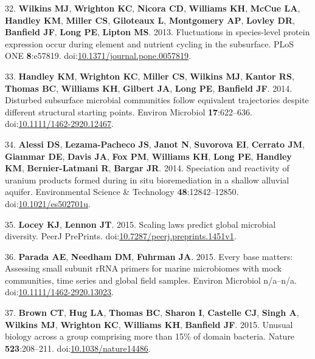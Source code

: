 \documentclass[11pt,]{article}
\begin{document}
\hypertarget{ref-Wilkins2013}{}
32. \textbf{Wilkins MJ}, \textbf{Wrighton KC}, \textbf{Nicora CD},
\textbf{Williams KH}, \textbf{McCue LA}, \textbf{Handley KM},
\textbf{Miller CS}, \textbf{Giloteaux L}, \textbf{Montgomery AP},
\textbf{Lovley DR}, \textbf{Banfield JF}, \textbf{Long PE},
\textbf{Lipton MS}. 2013. Fluctuations in species-level protein
expression occur during element and nutrient cycling in the subsurface.
PLoS ONE \textbf{8}:e57819.
doi:\href{https://doi.org/10.1371/journal.pone.0057819}{10.1371/journal.pone.0057819}.

\hypertarget{ref-Handley2014}{}
33. \textbf{Handley KM}, \textbf{Wrighton KC}, \textbf{Miller CS},
\textbf{Wilkins MJ}, \textbf{Kantor RS}, \textbf{Thomas BC},
\textbf{Williams KH}, \textbf{Gilbert JA}, \textbf{Long PE},
\textbf{Banfield JF}. 2014. Disturbed subsurface microbial communities
follow equivalent trajectories despite different structural starting
points. Environ Microbiol \textbf{17}:622--636.
doi:\href{https://doi.org/10.1111/1462-2920.12467}{10.1111/1462-2920.12467}.

\hypertarget{ref-Alessi2014}{}
34. \textbf{Alessi DS}, \textbf{Lezama-Pacheco JS}, \textbf{Janot N},
\textbf{Suvorova EI}, \textbf{Cerrato JM}, \textbf{Giammar DE},
\textbf{Davis JA}, \textbf{Fox PM}, \textbf{Williams KH}, \textbf{Long
PE}, \textbf{Handley KM}, \textbf{Bernier-Latmani R}, \textbf{Bargar
JR}. 2014. Speciation and reactivity of uranium products formed during
in situ bioremediation in a shallow alluvial aquifer. Environmental
Science \& Technology \textbf{48}:12842--12850.
doi:\href{https://doi.org/10.1021/es502701u}{10.1021/es502701u}.

\hypertarget{ref-Locey2015}{}
35. \textbf{Locey KJ}, \textbf{Lennon JT}. 2015. Scaling laws predict
global microbial diversity. PeerJ PrePrints.
doi:\href{https://doi.org/10.7287/peerj.preprints.1451v1}{10.7287/peerj.preprints.1451v1}.

\hypertarget{ref-Parada2015}{}
36. \textbf{Parada AE}, \textbf{Needham DM}, \textbf{Fuhrman JA}. 2015.
Every base matters: Assessing small subunit rRNA primers for marine
microbiomes with mock communities, time series and global field samples.
Environ Microbiol n/a--n/a.
doi:\href{https://doi.org/10.1111/1462-2920.13023}{10.1111/1462-2920.13023}.

\hypertarget{ref-Brown2015}{}
37. \textbf{Brown CT}, \textbf{Hug LA}, \textbf{Thomas BC},
\textbf{Sharon I}, \textbf{Castelle CJ}, \textbf{Singh A},
\textbf{Wilkins MJ}, \textbf{Wrighton KC}, \textbf{Williams KH},
\textbf{Banfield JF}. 2015. Unusual biology across a group comprising
more than 15\% of domain bacteria. Nature \textbf{523}:208--211.
doi:\href{https://doi.org/10.1038/nature14486}{10.1038/nature14486}.
\end{document}
